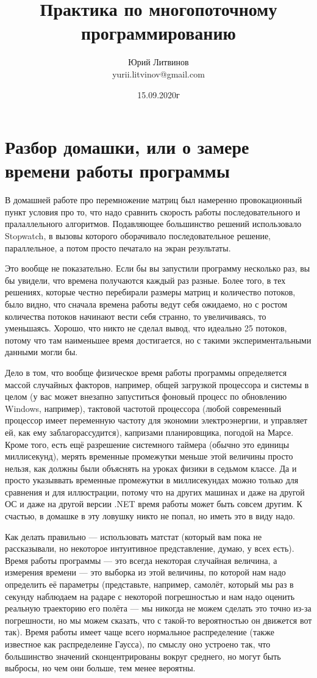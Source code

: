 \documentclass[a5paper]{article}
\title{Практика по многопоточному программированию}
\author{Юрий Литвинов\\\small{yurii.litvinov@gmail.com}}
\date{15.09.2020г}
\begin{document}
\maketitle
\thispagestyle{empty}

\section{Разбор домашки, или о замере времени работы программы}

В домашней работе про перемножение матриц был намеренно провокационный пункт условия про то, что надо сравнить скорость работы последовательного и пралаллельного алгоритмов. Подавляющее большинство решений использовало Stopwatch, в вызовы которого оборачивало последовательное решение, параллельное, а потом просто печатало на экран результаты.

Это вообще не показательно. Если бы вы запустили программу несколько раз, вы бы увидели, что времена получаются каждый раз разные. Более того, в тех решениях, которые честно перебирали размеры матриц и количество потоков, было видно, что сначала времена работы ведут себя ожидаемо, но с ростом количества потоков начинают вести себя странно, то увеличиваясь, то уменьшаясь. Хорошо, что никто не сделал вывод, что идеально 25 потоков, потому что там наименьшее время достигается, но с такими экспериментальными данными могли бы.

Дело в том, что вообще физическое время работы программы определяется массой случайных факторов, например, общей загрузкой процессора и системы в целом (у вас может внезапно запуститься фоновый процесс по обновлению Windows, например), тактовой частотой процессора (любой современный процессор имеет переменную частоту для экономии электроэнергии, и управляет ей, как ему заблагорассудится), капризами планировщика, погодой на Марсе. Кроме того, есть ещё разрешение системного таймера (обычно это единицы миллисекунд), мерять временные промежутки меньше этой величины просто нельзя, как должны были объяснять на уроках физики в седьмом классе. Да и просто указыввать временные промежутки в миллисекундах можно только для сравнения и для иллюстрации, потому что на других машинах и даже на другой ОС и даже на другой версии .NET время работы может быть совсем другим. К счастью, в домашке в эту ловушку никто не попал, но иметь это в виду надо.

Как делать правильно --- использовать матстат (который вам пока не рассказывали, но некоторое интуитивное представление, думаю, у всех есть). Время работы программы --- это всегда некоторая случайная величина, а измерения времени --- это выборка из этой величины, по которой нам надо определить её параметры (представьте, например, самолёт, который мы раз в секунду наблюдаем на радаре с некоторой погрешностью и нам надо оценить реальную траекторию его полёта --- мы никогда не можем сделать это точно из-за погрешности, но мы можем сказать, что с такой-то вероятностью он движется вот так). Время работы имеет чаще всего нормальное распределение (также известное как распределеине Гаусса), по смыслу оно устроено так, что большинство значений сконцентрированы вокруг среднего, но могут быть выбросы, но чем они больше, тем менее вероятны. 
\end{document}
